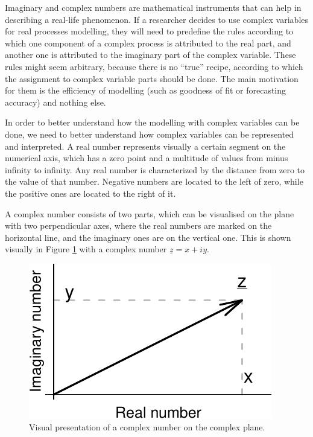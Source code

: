 \documentclass[
]{book}
\begin{document}
Imaginary and complex numbers are mathematical instruments that can help in describing a real-life phenomenon. If a researcher decides to use complex variables for real processes modelling, they will need to predefine the rules according to which one component of a complex process is attributed to the real part, and another one is attributed to the imaginary part of the complex variable. These rules might seem arbitrary, because there is no ``true'' recipe, according to which the assignment to complex variable parts should be done. The main motivation for them is the efficiency of modelling (such as goodness of fit or forecasting accuracy) and nothing else.

In order to better understand how the modelling with complex variables can be done, we need to better understand how complex variables can be represented and interpreted. A real number represents visually a certain segment on the numerical axis, which has a zero point and a multitude of values from minus infinity to infinity. Any real number is characterized by the distance from zero to the value of that number. Negative numbers are located to the left of zero, while the positive ones are located to the right of it.

A complex number consists of two parts, which can be visualised on the plane with two perpendicular axes, where the real numbers are marked on the horizontal line, and the imaginary ones are on the vertical one. This is shown visually in Figure \ref{fig:complexPlane} with a complex number \(\underline{z}=x+iy\).

\begin{figure}
\centering
\includegraphics{Svetunkov---Svetunkov---Complex-Dynamic-Models_files/figure-latex/complexPlane-1.pdf}
\caption{\label{fig:complexPlane}Visual presentation of a complex number on the complex plane.}
\end{figure}
\end{document}
